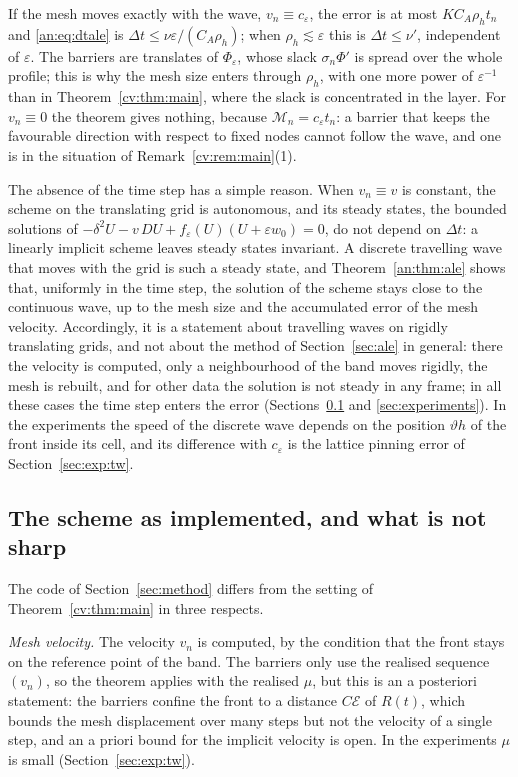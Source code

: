 \documentclass[11pt]{amsart}
\theoremstyle{definition}
\theoremstyle{remark}
\newcommand{\ve}{\varepsilon}
\begin{document}
If the mesh moves exactly with the wave, $v_n\equiv c_\ve$, the error is at most
$KC_A\rho_ht_n$ and \eqref{an:eq:dtale} is $\Delta t\le\nu\ve/(C_A\rho_h)$; when $\rho_h\lesssim\ve$
this is $\Delta t\le\nu'$, independent of $\ve$. The barriers are translates of $\Phi_\ve$, whose
slack $\sigma_n\Phi'$ is spread over the whole profile; this is why the mesh size enters
through $\rho_h$, with one more power of $\ve^{-1}$ than in Theorem~\ref{cv:thm:main}, where
the slack is concentrated in the layer. For $v_n\equiv0$ the theorem gives nothing,
because $\mathcal M_n=c_\ve t_n$: a barrier that keeps the favourable direction with respect to
fixed nodes cannot follow the wave, and one is in the situation of
Remark~\ref{cv:rem:main}(1).

The absence of the time step has a simple reason. When $v_n\equiv v$ is constant, the scheme
on the translating grid is autonomous, and its steady states, the bounded solutions of
$-\delta^2U-v\,DU+f_\ve(U)(U+\ve w_0)=0$, do not depend on $\Delta t$: a linearly implicit
scheme leaves steady states invariant. A discrete travelling wave that moves with the
grid is such a steady state, and Theorem~\ref{an:thm:ale} shows that, uniformly in the time
step, the solution of the scheme stays close to the continuous wave, up to the mesh size
and the accumulated error of the mesh velocity. Accordingly, it
is a statement about travelling waves on rigidly translating grids, and not about the
method of Section~\ref{sec:ale} in general: there the velocity is computed, only a
neighbourhood of the band moves rigidly, the mesh is rebuilt, and for other data the
solution is not steady in any frame; in all these cases the time step enters the error
(Sections~\ref{an:sec:impl} and \ref{sec:experiments}). In the experiments the speed of the
discrete wave depends on the position $\vartheta h$ of the front inside its cell, and its
difference with $c_\ve$ is the lattice pinning error of Section~\ref{sec:exp:tw}.

\subsection{The scheme as implemented, and what is not sharp}\label{an:sec:impl}

The code of Section~\ref{sec:method} differs from the setting of
Theorem~\ref{cv:thm:main} in three respects.

\emph{Mesh velocity.} The velocity $v_n$ is computed, by the condition that the front
stays on the reference point of the band. The barriers only use the realised sequence
$(v_n)$, so the theorem applies with the realised $\mu$, but this is an a posteriori
statement: the barriers confine the front to a distance $C\mathcal E$ of $R(t)$, which
bounds the mesh displacement over many steps but not the velocity of a single step,
and an a priori bound for the implicit velocity is open. In the experiments $\mu$ is
small (Section~\ref{sec:exp:tw}).
\end{document}
